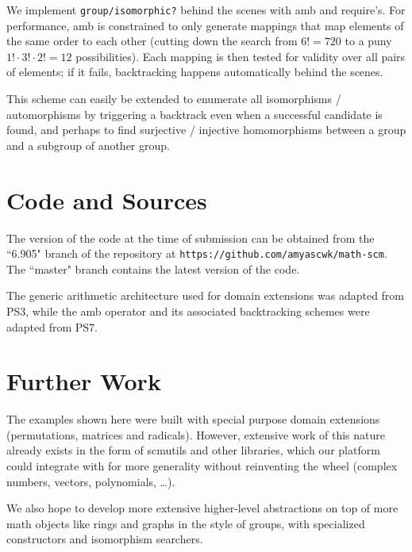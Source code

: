 \documentclass{article}
\begin{document}
            We implement \texttt{group/isomorphic?} behind the scenes with amb and require's. For performance, amb is constrained to only generate mappings that map elements of the same order to each other (cutting down the search from $6! = 720$ to a puny $1! \cdot 3! \cdot 2! = 12$ possibilities). Each mapping is then tested for validity over all pairs of elements; if it fails, backtracking happens automatically behind the scenes.
		
            This scheme can easily be extended to enumerate all isomorphisms / automorphisms by triggering a backtrack even when a successful candidate is found, and perhaps to find surjective / injective homomorphisms between a group and a subgroup of another group.    
    
    \section{Code and Sources}
        
        The version of the code at the time of submission can be obtained from the ``6.905" branch of the repository at \texttt{https://github.com/amyascwk/math-scm}. The ``master" branch contains the latest version of the code.

        
        The generic arithmetic architecture used for domain extensions was adapted from PS3, while the amb operator and its associated backtracking schemes were adapted from PS7.

	\section{Further Work}
	
	
	The examples shown here were built with special purpose domain extensions (permutations, matrices and radicals). However, extensive work of this nature already exists in the form of scmutils and other libraries, which our platform could integrate with for more generality without reinventing the wheel (complex numbers, vectors, polynomials, \ldots).
        
    We also hope to develop more extensive higher-level abstractions on top of more math objects like rings and graphs in the style of groups, with specialized constructors and isomorphism searchers.
    
\end{document}
